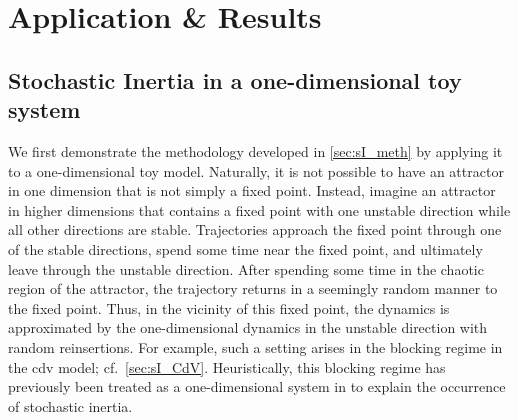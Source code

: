 \section{Application \& Results}\label{sec:sI_app}

\subsection{Stochastic Inertia in a one-dimensional toy system}\label{sec:sI_1d}

We first demonstrate the methodology developed in \cref{sec:sI_meth} by applying it to a one-dimensional toy model. Naturally, it is not possible to have an attractor in one dimension that is not simply a fixed point. Instead, imagine an attractor in higher dimensions that contains a fixed point with one unstable direction while all other directions are stable. Trajectories approach the fixed point through one of the stable directions, spend some time near the fixed point, and ultimately leave through the unstable direction. After spending some time in the chaotic region of the attractor, the trajectory returns in a seemingly random manner to the fixed point. Thus, in the vicinity of this fixed point, the dynamics is approximated by the one-dimensional dynamics in the unstable direction with random reinsertions. For example, such a setting arises in the blocking regime in the \gls{cdv} model; cf.~\cref{sec:sI_CdV}. Heuristically, this blocking regime has previously been treated as a one-dimensional system in \textcite{dorringtonInteractionStochasticForcing2023} to explain the occurrence of stochastic inertia.

